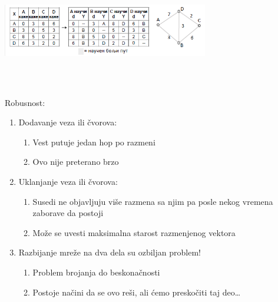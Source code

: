 \documentclass{article} %
\begin{document}
\begin{center}
		\vskip 5mm
		\includegraphics[width=9cm, height=5cm]{dv6}\\
		\vskip 5mm
\end{center}
\newpage
Robusnost:
\begin{enumerate}
	\item Dodavanje veza ili čvorova:
		\begin{enumerate}
			\item Vest putuje jedan hop po razmeni
			\item Ovo nije preterano brzo
		\end{enumerate}
	\item Uklanjanje veza ili čvorova:
		\begin{enumerate}
			\item Susedi ne objavljuju više razmena sa njim pa  posle nekog vremena zaborave da postoji
			\item Može se uvesti maksimalna starost razmenjenog vektora
		\end{enumerate}
	\item Razbijanje mreže na dva dela su ozbiljan problem!
		\begin{enumerate}
			\item Problem brojanja do beskonačnosti
			\item Postoje načini da se ovo reši, ali ćemo preskočiti taj deo…
		\end{enumerate}

\end{enumerate}
\end{document}
